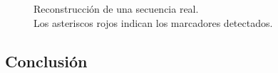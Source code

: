 \begin{figure}[!ht]
   \caption{Reconstrucción de una secuencia real.\\ Los asteriscos rojos indican los marcadores detectados.} 
   \label{img_reconstruccion_real2}    
\end{figure} 


\subsection{Conclusión} 

